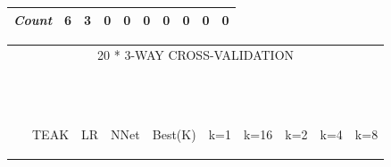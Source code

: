 \documentclass{sig-alternate}
\begin{document}
\begin{figure}[!t]
\begin{tabular}{lccccccccc|}
\rowcolor{DarkGray}\em Count	&	6	&	3	&	0	&	0	&	0	&	0	&	0	&	0	&	0	\\
\hline
\end{tabular}
\begin{tabular}{lccccccccc}
\multicolumn{10}{c}{20 * 3-WAY CROSS-VALIDATION}\\~\\~\\
&	\begin{sideways}\parbox{9mm}{TEAK}\end{sideways}	&	\begin{sideways}\parbox{9mm}{LR}\end{sideways}	&	\begin{sideways}\parbox{9mm}{NNet}\end{sideways}	&	\begin{sideways}\parbox{9mm}{Best(K)}\end{sideways}	&	\begin{sideways}\parbox{9mm}{k=1}\end{sideways}	&	\begin{sideways}\parbox{9mm}{k=16}\end{sideways}	&	\begin{sideways}\parbox{9mm}{k=2}\end{sideways}	&	\begin{sideways}\parbox{9mm}{k=4}\end{sideways}	&	\begin{sideways}\parbox{9mm}{k=8}\end{sideways}	\\\hline

\end{tabular}
\end{figure}
\end{document}
